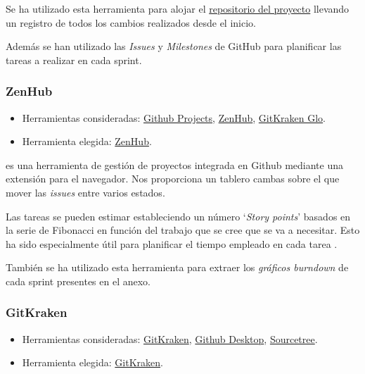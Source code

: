 Se ha utilizado esta herramienta para alojar el \href{https://github.com/IvanArjona/TFG-Datos-publicos}{repositorio del proyecto} llevando un registro de todos los cambios realizados desde el inicio.

Además se han utilizado las \textit{Issues} y \textit{Milestones} de GitHub para planificar las tareas a realizar en cada sprint.

\subsubsection{ZenHub} \label{zenhub}

\begin{itemize}
	\tightlist
	\item
	Herramientas consideradas:
	\href{https://help.github.com/articles/about-project-boards/}{Github Projects}, 
	\href{https://www.zenhub.com/}{ZenHub},
	\href{https://www.gitkraken.com/glo}{GitKraken Glo}.
	\item
	Herramienta elegida:
	\href{https://www.zenhub.com/}{ZenHub}.
\end{itemize}

 es una herramienta de gestión de proyectos integrada en Github mediante una extensión para el navegador. Nos proporciona un tablero cambas sobre el que mover las \textit{issues} entre varios estados.

Las tareas se pueden estimar estableciendo un número `\textit{Story points}' basados en la serie de Fibonacci en función del trabajo que se cree que se va a necesitar. Esto ha sido especialmente útil para planificar el tiempo empleado en cada tarea \cite{misc:zenhubestimate}.

También se ha utilizado esta herramienta para extraer los \textit{gráficos burndown} de cada sprint presentes en el anexo.

\subsubsection{GitKraken}

\begin{itemize}
	\tightlist
	\item
	Herramientas consideradas:
	\href{https://www.gitkraken.com/}{GitKraken}, 
	\href{https://desktop.github.com/}{Github Desktop},
	\href{https://www.sourcetreeapp.com/}{Sourcetree}.
	\item
	Herramienta elegida:
	\href{https://www.gitkraken.com/}{GitKraken}.
\end{itemize}

